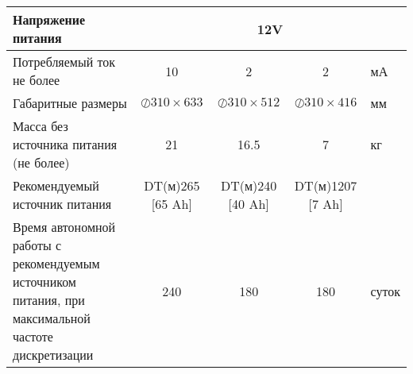 \begin{longtable}{|X |c |c |c| X|}
  \hline
        Напряжение питания & \multicolumn{4}{|c|}{12V} \\
  \hline
        Потребляемый ток не более & 10 & 2 & 2 & мА  \\
  \hline
        Габаритные размеры & $\oslash310\times633$ & $\oslash310\times512$ & $\oslash310\times416$ & мм  \\
  \hline
        Масса без источника питания (не более) & 21 & 16.5 & 7 & кг  \\
  \hline
        Рекомендуемый источник питания & DT(м)265 [65 Ah]  & DT(м)240 [40 Ah] & DT(м)1207 [7 Ah] &   \\
  \hline
        Время автономной работы с рекомендуемым источником питания, при максимальной частоте дискретизации & 240 & 180 & 180 & суток  \\
  \hline
  \hline
\end{longtable}
